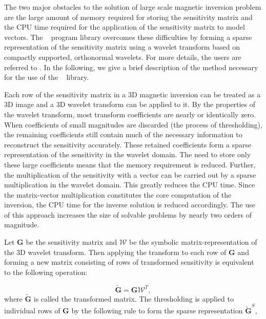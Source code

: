 The two major obstacles to the solution of large scale magnetic inversion problem are the large amount of memory required for storing the sensitivity matrix and the CPU time required for the application of the sensitivity matrix to model vectors. The \prog~ program library overcomes these difficulties by forming a sparse representation of the sensitivity matrix using a wavelet transform based on compactly supported, orthonormal wavelets. For more details, the users are referred to \cite{LiOldenburg03,LiOldenburg10}. In the following, we give a brief description of the method necessary for the use of the \prog~ library.

Each row of the sensitivity matrix in a 3D magnetic inversion can be treated as a 3D image and a 3D wavelet transform can be applied to it. By the properties of the wavelet transform, most transform coefficients are nearly or identically zero. When coefficients of small magnitudes are discarded (the process of thresholding), the remaining coefficients still contain much of the necessary information to reconstruct the sensitivity accurately. These retained coefficients form a sparse representation of the sensitivity in the wavelet domain. The need to store only these large coefficients means that the memory requirement is reduced. Further, the multiplication of the sensitivity with a vector can be carried out by a sparse multiplication in the wavelet domain. This greatly reduces the CPU time. Since the matrix-vector multiplication constitutes the core computation of the inversion, the CPU time for the inverse solution is reduced accordingly. The use of this approach increases the size of solvable problems by nearly two orders of magnitude.

Let $\mathbf{G}$ be the sensitivity matrix and $\mathcal{W}$ be the symbolic matrix-representation of the 3D wavelet transform. Then applying the transform to each row of $\mathbf{G}$ and forming a new matrix consisting of rows of transformed sensitivity is equivalent to the following operation:

\begin{equation}
\label{eq:senswvt}
\widetilde{\mathbf{G}}=\mathbf{G}\mathcal{W}^T,
\end{equation}
%
where $\widetilde{\mathbf{G}}$ is called the transformed matrix. The thresholding is applied to individual rows of $\mathbf{G}$ by the following rule to form the sparse representation $\widetilde{\mathbf{G}}^S$,

